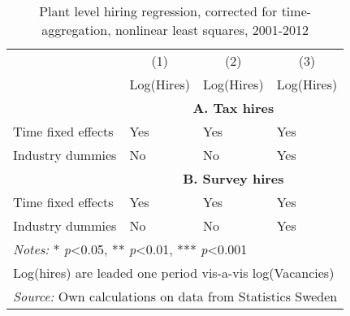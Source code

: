 \begin{table}[htbp]\centering
\def\sym#1{\ifmmode^{#1}\else\(^{#1}\)\fi}
\caption{\label{tab:robust_timeagg_nls} Plant level hiring regression, corrected for time-aggregation, nonlinear least squares,  2001-2012}
\begin{tabular}{llll}
\hline\hline
                &\multicolumn{1}{c}{(1)}&\multicolumn{1}{c}{(2)}&\multicolumn{1}{c}{(3)}\\
                &\multicolumn{1}{c}{Log(Hires)}&\multicolumn{1}{c}{Log(Hires)}&\multicolumn{1}{c}{Log(Hires)}\\
\hline

\hline
			    &\multicolumn{3}{c}{\textbf{A. Tax hires}} \\
\hline


\hline 
Time fixed effects  &         Yes         &         Yes         &         Yes                      \\
[1em]
Industry dummies    &          No         &          No         &         Yes               \\
[1em]
\hline 


\hline
			    &\multicolumn{3}{c}{\textbf{B. Survey hires}} \\
\hline


\hline 
Time fixed effects  &         Yes         &         Yes         &         Yes                      \\
[1em]
Industry dummies    &          No         &          No         &         Yes               \\
[1em]
\hline 


\hline\hline
\multicolumn{4}{l}{\footnotesize \emph{Notes:} * \emph{p}<0.05, ** \emph{p}<0.01, *** \emph{p}<0.001}\\
\multicolumn{4}{l}{\footnotesize Log(hires) are leaded one period vis-a-vis log(Vacancies)}\\
\multicolumn{4}{l}{\footnotesize \emph{Source:} Own calculations on data from Statistics Sweden}\\
\end{tabular}
\end{table}


